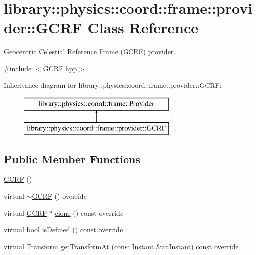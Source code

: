 \hypertarget{classlibrary_1_1physics_1_1coord_1_1frame_1_1provider_1_1_g_c_r_f}{}\section{library\+:\+:physics\+:\+:coord\+:\+:frame\+:\+:provider\+:\+:G\+C\+RF Class Reference}
\label{classlibrary_1_1physics_1_1coord_1_1frame_1_1provider_1_1_g_c_r_f}


Geocentric Celestial Reference \hyperlink{classlibrary_1_1physics_1_1coord_1_1_frame}{Frame} (\hyperlink{classlibrary_1_1physics_1_1coord_1_1frame_1_1provider_1_1_g_c_r_f}{G\+C\+RF}) provider.  




{\ttfamily \#include $<$G\+C\+R\+F.\+hpp$>$}

Inheritance diagram for library\+:\+:physics\+:\+:coord\+:\+:frame\+:\+:provider\+:\+:G\+C\+RF\+:\begin{figure}[H]
\begin{center}
\leavevmode
\includegraphics[height=2.000000cm]{classlibrary_1_1physics_1_1coord_1_1frame_1_1provider_1_1_g_c_r_f}
\end{center}
\end{figure}
\subsection*{Public Member Functions}
\begin{DoxyCompactItemize}
\item 
\hyperlink{classlibrary_1_1physics_1_1coord_1_1frame_1_1provider_1_1_g_c_r_f_abdfc6b33e7fa8b1bb8ebb43433c965d4}{G\+C\+RF} ()
\item 
virtual \hyperlink{classlibrary_1_1physics_1_1coord_1_1frame_1_1provider_1_1_g_c_r_f_a03afcfed40d923e0d14e53182331af9c}{$\sim$\+G\+C\+RF} () override
\item 
virtual \hyperlink{classlibrary_1_1physics_1_1coord_1_1frame_1_1provider_1_1_g_c_r_f}{G\+C\+RF} $\ast$ \hyperlink{classlibrary_1_1physics_1_1coord_1_1frame_1_1provider_1_1_g_c_r_f_ae32853b62bfe251fd48262b7ab383fc7}{clone} () const override
\item 
virtual bool \hyperlink{classlibrary_1_1physics_1_1coord_1_1frame_1_1provider_1_1_g_c_r_f_a0e6155c096ff1c231b14e59544fe038c}{is\+Defined} () const override
\item 
virtual \hyperlink{classlibrary_1_1physics_1_1coord_1_1_transform}{Transform} \hyperlink{classlibrary_1_1physics_1_1coord_1_1frame_1_1provider_1_1_g_c_r_f_a4929dae3032a650b74b77b0d0b9bcaaa}{get\+Transform\+At} (const \hyperlink{classlibrary_1_1physics_1_1time_1_1_instant}{Instant} \&an\+Instant) const override
\end{DoxyCompactItemize}


